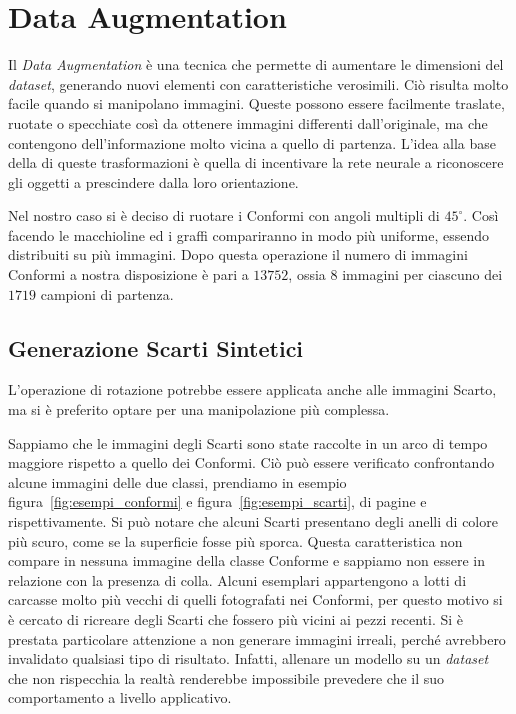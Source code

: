 
\clearpage
\section {Data Augmentation}
Il \textit{Data Augmentation} è una tecnica che permette di aumentare le dimensioni del \textit{dataset}, generando nuovi elementi con caratteristiche verosimili.
Ciò risulta molto facile quando si manipolano immagini.
Queste possono essere facilmente traslate, ruotate o specchiate così da ottenere immagini differenti dall'originale, ma che contengono dell'informazione molto vicina a quello di partenza.
L'idea alla base della di queste trasformazioni è quella di incentivare la rete neurale a riconoscere gli oggetti a prescindere dalla loro orientazione.

Nel nostro caso si è deciso di ruotare i Conformi con angoli multipli di $45^\circ$.
Così facendo le macchioline ed i graffi compariranno in modo più uniforme, essendo distribuiti su più immagini.
Dopo questa operazione il numero di immagini Conformi a nostra disposizione è pari a $13752$, ossia $8$ immagini per ciascuno dei $1719$ campioni di partenza.

\subsection {Generazione Scarti Sintetici}
L'operazione di rotazione potrebbe essere applicata anche alle immagini Scarto, ma si è preferito optare per una manipolazione più complessa.

Sappiamo che le immagini degli Scarti sono state raccolte in un arco di tempo maggiore rispetto a quello dei Conformi.
Ciò può essere verificato confrontando alcune immagini delle due classi, prendiamo in esempio figura~\ref{fig:esempi_conformi} e figura~\ref{fig:esempi_scarti}, di pagine \pageref{fig:esempi_conformi} e \pageref{fig:esempi_scarti} rispettivamente.
Si può notare che alcuni Scarti presentano degli anelli di colore più scuro, come se la superficie fosse più sporca.
Questa caratteristica non compare in nessuna immagine della classe Conforme e sappiamo non essere in relazione con la presenza di colla.
Alcuni esemplari appartengono a lotti di carcasse molto più vecchi di quelli fotografati nei Conformi, per questo motivo si è cercato di ricreare degli Scarti che fossero più vicini ai pezzi recenti.
Si è prestata particolare attenzione a non generare immagini irreali, perché avrebbero invalidato qualsiasi tipo di risultato.
Infatti, allenare un modello su un \textit{dataset} che non rispecchia la realtà renderebbe impossibile prevedere che il suo comportamento a livello applicativo.

